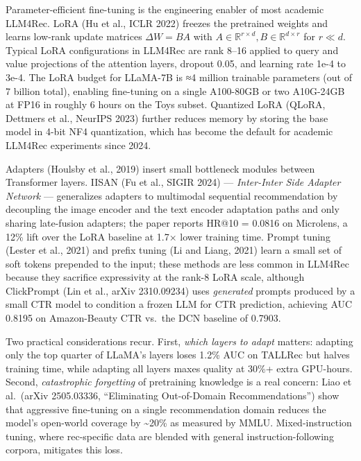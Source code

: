 Parameter-efficient fine-tuning is the engineering enabler of most academic LLM4Rec. LoRA (Hu et al., ICLR 2022) freezes the pretrained weights and learns low-rank update matrices \(\Delta W = BA\) with \(A \in \mathbb{R}^{r \times d}, B \in \mathbb{R}^{d \times r}\) for \(r \ll d\). Typical LoRA configurations in LLM4Rec are rank 8--16 applied to query and value projections of the attention layers, dropout 0.05, and learning rate 1e-4 to 3e-4. The LoRA budget for LLaMA-7B is ≈4 million trainable parameters (out of 7 billion total), enabling fine-tuning on a single A100-80GB or two A10G-24GB at FP16 in roughly 6 hours on the Toys subset. Quantized LoRA (QLoRA, Dettmers et al., NeurIPS 2023) further reduces memory by storing the base model in 4-bit NF4 quantization, which has become the default for academic LLM4Rec experiments since 2024.

Adapters (Houlsby et al., 2019) insert small bottleneck modules between Transformer layers. IISAN (Fu et al., SIGIR 2024) --- \emph{Inter-Inter Side Adapter Network} --- generalizes adapters to multimodal sequential recommendation by decoupling the image encoder and the text encoder adaptation paths and only sharing late-fusion adapters; the paper reports HR@10 = 0.0816 on Microlens, a 12\% lift over the LoRA baseline at 1.7× lower training time. Prompt tuning (Lester et al., 2021) and prefix tuning (Li and Liang, 2021) learn a small set of soft tokens prepended to the input; these methods are less common in LLM4Rec because they sacrifice expressivity at the rank-8 LoRA scale, although ClickPrompt (Lin et al., arXiv 2310.09234) uses \emph{generated} prompts produced by a small CTR model to condition a frozen LLM for CTR prediction, achieving AUC 0.8195 on Amazon-Beauty CTR vs.~the DCN baseline of 0.7903.

Two practical considerations recur. First, \emph{which layers to adapt} matters: adapting only the top quarter of LLaMA's layers loses 1.2\% AUC on TALLRec but halves training time, while adapting all layers maxes quality at 30\%+ extra GPU-hours. Second, \emph{catastrophic forgetting} of pretraining knowledge is a real concern: Liao et al.~(arXiv 2505.03336, ``Eliminating Out-of-Domain Recommendations'') show that aggressive fine-tuning on a single recommendation domain reduces the model's open-world coverage by \textasciitilde20\% as measured by MMLU. Mixed-instruction tuning, where rec-specific data are blended with general instruction-following corpora, mitigates this loss.

